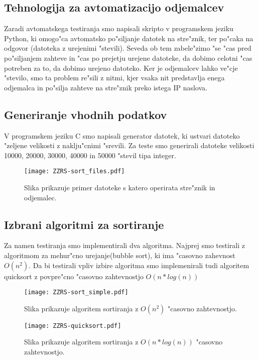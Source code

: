 \subsection{Tehnologija za avtomatizacijo odjemalcev}
Zaradi avtomatskega testiranja smo napisali skripto v programskem jeziku Python, ki omogo"ca avtomatsko po"siljanje datotek na stre"znik, ter po"caka na odgovor (datoteka z urejenimi "stevili). Seveda ob tem zabele"zimo "se "cas pred po"siljanjem zahteve in "cas po prejetju urejene datoteke, da dobimo celotni "cas potreben za to, da dobimo urejeno datoteko. Ker je odjemalcev lahko ve"cje "stevilo, smo ta problem re"sili z nitmi, kjer vsaka nit predstavlja enega odjemalca in po"silja zahteve na stre"znik preko istega IP naslova.

\subsection{Generiranje vhodnih podatkov}
V programskem jeziku C smo napisali generator datotek, ki ustvari datoteko "zeljene velikosti z naklju"cnimi "srevili. Za teste smo generirali datoteke velikosti 10000, 20000, 30000, 40000 in 50000 "stevil tipa integer.

\begin{figure} [!h]
  \centering
    \texttt{[image: ZZRS-sort\_files.pdf]} 
  \caption{Slika prikazuje primer datoteke s katero operirata stre"znik in odjemalec.}
  \label{8_files}  
\end{figure}

\subsection{Izbrani algoritmi za sortiranje}
Za namen testiranja smo implementirali dva algoritma. Najprej smo testirali z algoritmom za mehur"cno urejanje(bubble sort), ki ima "casovno zahevnost $O(n^2)$.
Da bi testirali vpliv izbire algoritma smo implemenirali tudi algoritem quicksort z povpre"cno "casovno zahtevnostjo $O(n* log(n))$

\begin{figure}  [!h]
  \centering
    \texttt{[image: ZZRS-sort\_simple.pdf]}
  \caption{Slika prikazuje algoritem sortiranja z $O(n^2)$ "casovno zahtevnostjo.}
  \label{8_sort}  
\end{figure}

\begin{figure}  [!h]
	\centering
	\texttt{[image: ZZRS-quicksort.pdf]}
	\caption{Slika prikazuje algoritem sortiranja z $O(n* log(n))$ "casovno zahtevnostjo.}
	\label{8_quicksort}  
\end{figure}


